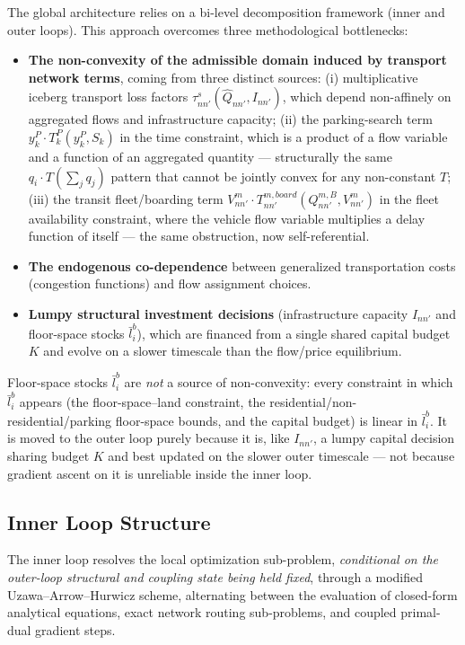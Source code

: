 \documentclass[11pt,a4paper]{article}
\begin{document}
The global architecture relies on a bi-level decomposition framework (inner and outer loops). This approach overcomes three methodological bottlenecks:
\begin{itemize}
    \item \textbf{The non-convexity of the admissible domain induced by transport network terms}, coming from three distinct sources: (i) multiplicative iceberg transport loss factors $\tau^s_{nn'}(\hat Q_{nn'}, I_{nn'})$, which depend non-affinely on aggregated flows and infrastructure capacity; (ii) the parking-search term $y_k^{P}\cdot T^P_k(y_k^P, S_k)$ in the time constraint, which is a product of a flow variable and a function of an aggregated quantity — structurally the same $q_i\cdot T(\sum_j q_j)$ pattern that cannot be jointly convex for any non-constant $T$; (iii) the transit fleet/boarding term $V^m_{nn'}\cdot T^{m,board}_{nn'}(Q^{m,B}_{nn'}, V^m_{nn'})$ in the fleet availability constraint, where the vehicle flow variable multiplies a delay function of itself — the same obstruction, now self-referential.
    \item \textbf{The endogenous co-dependence} between generalized transportation costs (congestion functions) and flow assignment choices.
    \item \textbf{Lumpy structural investment decisions} (infrastructure capacity $I_{nn'}$ and floor-space stocks $\bar l_i^b$), which are financed from a single shared capital budget $K$ and evolve on a slower timescale than the flow/price equilibrium.
\end{itemize}
Floor-space stocks $\bar l_i^b$ are \emph{not} a source of non-convexity: every constraint in which $\bar l_i^b$ appears (the floor-space--land constraint, the residential/non-residential/parking floor-space bounds, and the capital budget) is linear in $\bar l_i^b$. It is moved to the outer loop purely because it is, like $I_{nn'}$, a lumpy capital decision sharing budget $K$ and best updated on the slower outer timescale — not because gradient ascent on it is unreliable inside the inner loop.

\subsection{Inner Loop Structure}

The inner loop resolves the local optimization sub-problem, \emph{conditional on the outer-loop structural and coupling state being held fixed}, through a modified Uzawa--Arrow--Hurwicz scheme, alternating between the evaluation of closed-form analytical equations, exact network routing sub-problems, and coupled primal-dual gradient steps.
\end{document}

